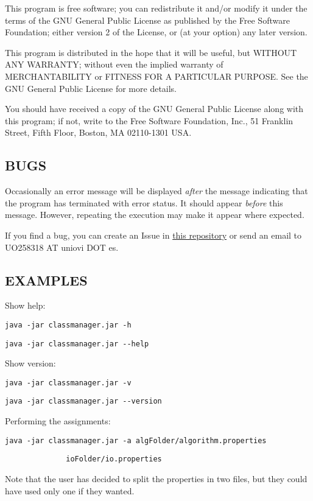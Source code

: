 This program is free software; you can redistribute it and/or modify
it under the terms of the GNU General Public License as published by
the Free Software Foundation; either version 2 of the License, or
(at your option) any later version.

This program is distributed in the hope that it will be useful,
but WITHOUT ANY WARRANTY; without even the implied warranty of
MERCHANTABILITY or FITNESS FOR A PARTICULAR PURPOSE.  See the
GNU General Public License for more details.

You should have received a copy of the GNU General Public License along with this program; if not, write to the Free Software Foundation, Inc., 51 Franklin Street, Fifth Floor, Boston, MA 02110-1301 USA.


\subsection*{BUGS}


Occasionally an error message will be displayed \textit{after} the message indicating that the program has terminated with error status. It should appear \textit{before} this message. However, repeating the execution may make it appear where expected. 

If you find a bug, you can create an Issue in \href{https://github.com/fonsecadh/classroom-manager-code}{this repository} or send an email to UO258318 AT uniovi DOT es.


\subsection*{EXAMPLES}

Show help:

\verb|java -jar classmanager.jar -h|

\verb|java -jar classmanager.jar --help|

Show version:

\verb|java -jar classmanager.jar -v|

\verb|java -jar classmanager.jar --version|

Performing the assignments:

\verb|java -jar classmanager.jar -a algFolder/algorithm.properties|

\verb|              ioFolder/io.properties|

Note that the user has decided to split the properties in two files, but they could have used only one if they wanted.

